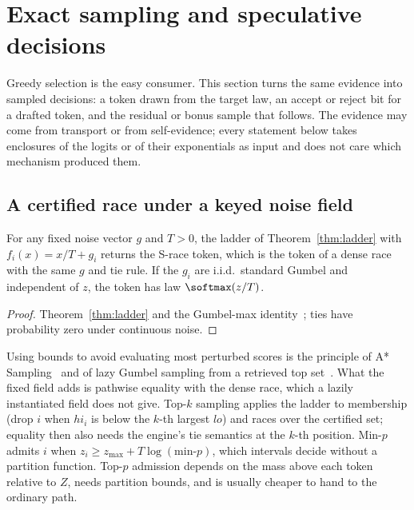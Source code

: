 \section{Exact sampling and speculative decisions}\label{sec:decisions}
Greedy selection is the easy consumer. This section turns the same evidence into sampled decisions: a token drawn from the target law, an accept or reject bit for a drafted token, and the residual or bonus sample that follows. The evidence may come from transport or from self-evidence; every statement below takes enclosures of the logits or of their exponentials as input and does not care which mechanism produced them.

\subsection{A certified race under a keyed noise field}\label{sec:race}
\begin{theorem}\label{thm:race}
For any fixed noise vector $g$ and $T>0$, the ladder of Theorem~\ref{thm:ladder} with $f_i(x)=x/T+g_i$ returns the S-race token, which is the token of a dense race with the same $g$ and tie rule. If the $g_i$ are i.i.d.\ standard Gumbel and independent of $z$, the token has law $\softmax(z/T)$.
\end{theorem}
\begin{proof}
Theorem~\ref{thm:ladder} and the Gumbel-max identity~\cite{gumbel1954,papandreou2011}; ties have probability zero under continuous noise.
\end{proof}
Using bounds to avoid evaluating most perturbed scores is the principle of A* Sampling~\cite{astar} and of lazy Gumbel sampling from a retrieved top set~\cite{mussmann2017}. What the fixed field adds is pathwise equality with the dense race, which a lazily instantiated field does not give. Top-$k$ sampling applies the ladder to membership (drop $i$ when $hi_i$ is below the $k$-th largest $lo$) and races over the certified set; equality then also needs the engine's tie semantics at the $k$-th position. Min-$p$ admits $i$ when $z_i\ge z_{\max}+T\log(\text{min-}p)$, which intervals decide without a partition function. Top-$p$ admission depends on the mass above each token relative to $Z$, needs partition bounds, and is usually cheaper to hand to the ordinary path.

